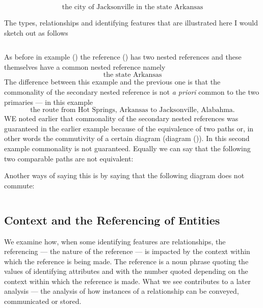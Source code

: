 \begin{equation}
\mbox{the city of Jacksonville in the state  Arkansas}
\end{equation}

The types, relationships and identifying features that are illustrated here
I would sketch out as follows

\begin{equation*}

\end{equation*}
\begin{equation*}

\end{equation*}


\mynote 
As before in example () the reference () has two nested references and these themselves have a common nested reference namely
\begin{equation*}
\mbox{the state Arkansas}
\end{equation*}
The difference between this example and the previous one is that the commonality of the secondary nested reference is not  \textit{a priori}
 common to the two primaries --- in this example
 \begin{equation*}
 \mbox{the route from Hot Springs, Arkansas to Jacksonville, Alabahma.}
\end{equation*}
\mynote
WE noted earlier that commonality of the secondary nested references was guaranteed in the earlier example because of the equivalence of two paths or, in other words the commutivity of a certain diagram (diagram ()).
In this second example commonality is not guaranteed. Equally we can say that the following two comparable paths are not equivalent:

Another ways of saying this is by saying that the following diagram does not commute:
\begin{equation*}

\end{equation*}

\begin{equation*}

\end{equation*}

\subsection{Context and the Referencing of Entities}
\mynote
We examine how,  when some identifying features are relationships, the referencing 
--- the nature of the reference ---   
is impacted by the context within which the reference is being made. 
The reference is  a noun phrase quoting the values of identifying attributes
and with the number quoted depending on 
the context within which the reference is made.
What we see contributes to a later analysis --- the analysis of  how 
instances of a relationship can be conveyed, communicated or stored.
